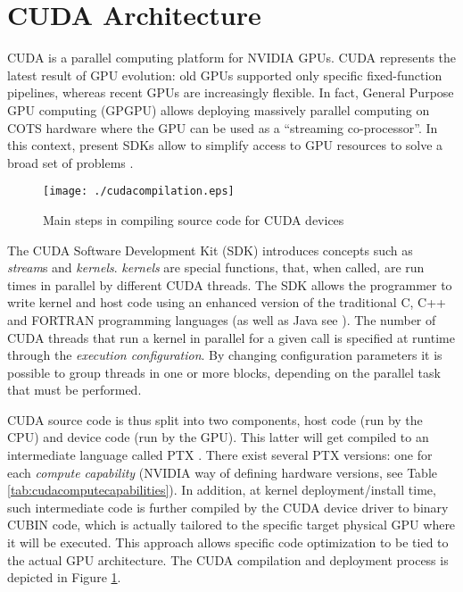 \documentclass[11pt,onecolumn,letterpaper]{IEEEtran}
\begin{document}
\section{CUDA Architecture}
\label{cuda}
CUDA is a parallel computing platform for NVIDIA GPUs. 
CUDA represents the latest result of GPU evolution: old GPUs supported only specific fixed-function pipelines, whereas recent GPUs are 
increasingly flexible.
In fact, General Purpose GPU computing (GPGPU) \cite{gpgpu2} allows deploying massively parallel computing on COTS hardware
where the GPU can be used as a ``streaming co-processor''. 
In this context, present SDKs allow to simplify access to GPU resources to solve a broad set of problems \cite{gpgpu}. 

\begin{figure}[t]
 \centering
 \texttt{[image: ./cudacompilation.eps]}
 \caption{Main steps in compiling source code for CUDA devices}
 \label{fig:CUDA_Compiling}
\end{figure}

The CUDA Software Development Kit (SDK) introduces concepts such as \emph{stream}s and \emph{kernels}.
\emph{kernels} are special functions, that, when called, are run  times in parallel by  different CUDA threads. 
The SDK allows the programmer to write kernel and host code using an enhanced version of the traditional C, C++ and FORTRAN programming languages (as well as Java see \cite{jcuda}).
The number of CUDA threads that run a kernel in parallel for a given call is specified at runtime through the \emph{execution configuration}. 
By changing configuration parameters it is possible to group threads in one or more blocks, depending on the parallel task that must be performed.

CUDA source code is thus split into two components, host code (run by the CPU) and device code (run by the GPU).
This latter will get compiled to an intermediate language called PTX \cite{cudadevguide}.
There exist several PTX versions: one for each \textit{compute capability} (NVIDIA way of defining hardware versions, see Table \ref{tab:cudacomputecapabilities}).
In addition, at kernel deployment/install time, such intermediate code is further compiled by the CUDA device driver to binary CUBIN code,
which is actually tailored to the specific target physical GPU where it will be executed.
This approach allows specific code optimization to be tied to the actual GPU architecture. The CUDA compilation and deployment process is depicted in Figure \ref{fig:CUDA_Compiling}.
\end{document}
